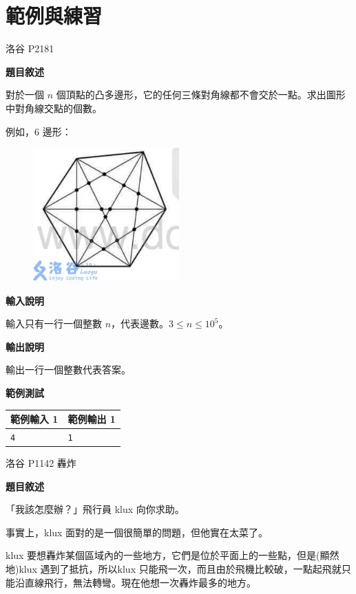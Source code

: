 \section{範例與練習}
    \problem 洛谷 P2181

    \textbf{題目敘述}

    對於一個 $n$ 個頂點的凸多邊形，它的任何三條對角線都不會交於一點。求出圖形中對角線交點的個數。

    例如，$6$ 邊形：

    \begin{figure}[!htbp]
        \centering
        \includegraphics[width=0.5\textwidth]{../Images/Vector2.png}
    \end{figure}

    \textbf{輸入說明}

    輸入只有一行一個整數 $n$，代表邊數。$3 \leq n \leq 10^5$。

    \textbf{輸出說明}

    輸出一行一個整數代表答案。

    \textbf{範例測試}

    \begin{tabular}{|m{7cm}|m{7cm}|}
        \hline
        範例輸入 1 & 範例輸出 1 \\
        \hline
        \verb|4| & \verb|1| \\
        \hline
    \end{tabular}

    \problem 洛谷 P1142 轟炸

    \textbf{題目敘述}

    「我該怎麼辦？」飛行員 klux 向你求助。

    事實上，klux 面對的是一個很簡單的問題，但他實在太菜了。

    klux 要想轟炸某個區域內的一些地方，它們是位於平面上的一些點，但是(顯然地)klux 遇到了抵抗，所以klux 只能飛一次，而且由於飛機比較破，一點起飛就只能沿直線飛行，無法轉彎。現在他想一次轟炸最多的地方。

